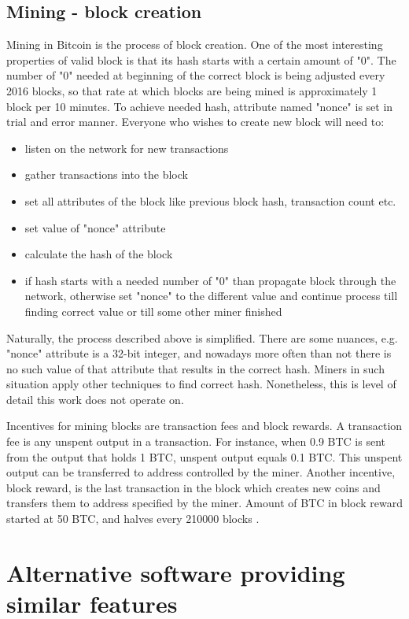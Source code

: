 \documentclass[12pt, en, eng, oneside, final]{mgr}
\begin{document}
\section{Mining - block creation}
Mining in Bitcoin is the process of block creation. One of the most interesting properties of valid block is that its hash starts with a certain amount of "0". The number of "0" needed at beginning of the correct block is being adjusted every 2016 blocks, so that rate at which blocks are being mined is approximately 1 block per 10 minutes. To achieve needed hash, attribute named "nonce" is set in trial and error manner. Everyone who wishes to create new block will need to:

\begin{itemize}
\item
listen on the network for new transactions
\item
gather transactions into the block
\item
set all attributes of the block like previous block hash, transaction count etc.
\item
set value of "nonce" attribute
\item
calculate the hash of the block
\item
if hash starts with a needed number of "0" than propagate block through the network, otherwise set "nonce" to the different value and continue process till finding correct value or till some other miner finished 
\end{itemize}

Naturally, the process described above is simplified. There are some nuances, e.g. "nonce" attribute is a 32-bit integer, and nowadays more often than not there is no such value of that attribute that results in the correct hash. Miners in such situation apply other techniques to find correct hash. Nonetheless, this is level of detail this work does not operate on.
 
Incentives for mining blocks are transaction fees and block rewards. A transaction fee is any unspent output in a transaction. For instance, when 0.9 BTC is sent from the output that holds 1 BTC, unspent output equals 0.1 BTC. This unspent output can be transferred to address controlled by the miner.  
Another incentive, block reward, is the last transaction in the block which creates new coins and transfers them to address specified by the miner. Amount of BTC in block reward started at 50 BTC, and halves every 210000 blocks \cite{currency-supply}.


\chapter{Alternative software providing similar features}
\end{document}
